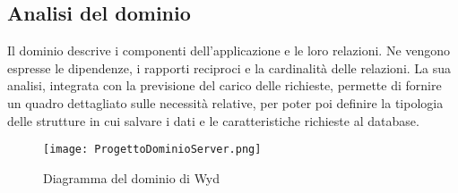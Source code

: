 \subsection{Analisi del dominio}

Il dominio descrive i componenti dell'applicazione e le loro relazioni. 
Ne vengono espresse le dipendenze, i rapporti reciproci e la cardinalità delle relazioni. 
La sua analisi, integrata con la previsione del carico delle richieste,
permette di fornire un quadro dettagliato sulle necessità relative,
per poter poi definire la tipologia delle strutture in cui salvare i dati e
le caratteristiche richieste al database.\\

\begin{figure}[htpb]
    \centering
    \texttt{[image: ProgettoDominioServer.png]}
    \caption{Diagramma del dominio di Wyd}
\end{figure}


